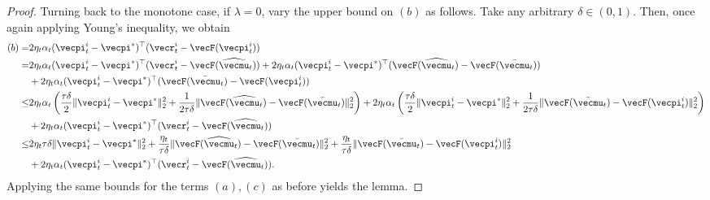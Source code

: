 \begin{proof}
Turning back to the monotone case, if $\lambda=0$, vary the upper bound on $(b)$ as follows.
Take any arbitrary $\delta \in (0,1)$.
Then, once again applying Young's inequality, we obtain
\begin{align*}
(b) = & 2\eta_t\alpha_t (\vecpi_t^i - \vecpi^*)^\top (\vecr_t^i - \vecF(\vecpi_t^i)) \\
 = & 2\eta_t\alpha_t (\vecpi_t^i - \vecpi^*)^\top (\vecr_t^i - \vecF(\widehat{\vecmu}_t)) + 2\eta_t\alpha_t (\vecpi_t^i - \vecpi^*)^\top (\vecF(\widehat{\vecmu}_t) - \vecF(\bar{\vecmu}_t)) \\
    & + 2\eta_t\alpha_t (\vecpi_t^i - \vecpi^*)^\top (\vecF(\bar{\vecmu}_t) - \vecF(\vecpi_t^i)) \\
\leq &2\eta_t\alpha_t \left( \frac{\tau\delta}{2} \|\vecpi_t^i - \vecpi^* \|_2^2 + \frac{1}{2\tau\delta} \|\vecF(\widehat{\vecmu}_t) - \vecF(\bar{\vecmu}_t)\|_2^2\right) + 2\eta_t\alpha_t \left(\frac{\tau\delta}{2} \|\vecpi_t^i - \vecpi^* \|_2^2 + \frac{1}{2\tau\delta} \|\vecF(\bar{\vecmu}_t) - \vecF(\vecpi_t^i)\|_2^2 \right)  \\
    &+2\eta_t\alpha_t (\vecpi_t^i - \vecpi^*)^\top (\vecr_t^i - \vecF(\widehat{\vecmu}_t)) \\
\leq & 2 \eta_t \tau\delta \|\vecpi_t^i - \vecpi^* \|_2^2 + \frac{\eta_t}{\tau\delta}\|\vecF(\widehat{\vecmu}_t) - \vecF(\bar{\vecmu}_t)\|_2^2 + \frac{\eta_t}{\tau\delta} \|\vecF(\bar{\vecmu}_t) - \vecF(\vecpi_t^i)\|_2^2 \\
    &+2\eta_t\alpha_t (\vecpi_t^i - \vecpi^*)^\top (\vecr_t^i - \vecF(\widehat{\vecmu}_t)).
\end{align*}
Applying the same bounds for the terms $(a), (c)$ as before yields  the lemma.
\end{proof}


